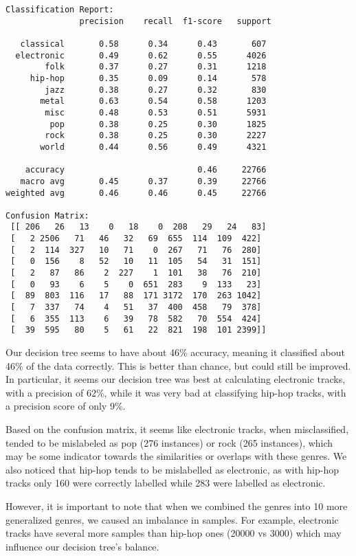 \documentclass[11pt]{article}
\begin{document}
    \begin{Verbatim}[commandchars=\\\{\}]
Classification Report:
               precision    recall  f1-score   support

   classical       0.58      0.34      0.43       607
  electronic       0.49      0.62      0.55      4026
        folk       0.37      0.27      0.31      1218
     hip-hop       0.35      0.09      0.14       578
        jazz       0.38      0.27      0.32       830
       metal       0.63      0.54      0.58      1203
        misc       0.48      0.53      0.51      5931
         pop       0.38      0.25      0.30      1825
        rock       0.38      0.25      0.30      2227
       world       0.44      0.56      0.49      4321

    accuracy                           0.46     22766
   macro avg       0.45      0.37      0.39     22766
weighted avg       0.46      0.46      0.45     22766

Confusion Matrix:
 [[ 206   26   13    0   18    0  208   29   24   83]
 [   2 2506   71   46   32   69  655  114  109  422]
 [   2  114  327   10   71    0  267   71   76  280]
 [   0  156    8   52   10   11  105   54   31  151]
 [   2   87   86    2  227    1  101   38   76  210]
 [   0   93    6    5    0  651  283    9  133   23]
 [  89  803  116   17   88  171 3172  170  263 1042]
 [   7  337   74    4   51   37  400  458   79  378]
 [   6  355  113    6   39   78  582   70  554  424]
 [  39  595   80    5   61   22  821  198  101 2399]]
    \end{Verbatim}

    Our decision tree seems to have about 46\% accuracy, meaning it
classified about 46\% of the data correctly. This is better than chance,
but could still be improved. In particular, it seems our decision tree
was best at calculating electronic tracks, with a precision of 62\%,
while it was very bad at classifying hip-hop tracks, with a precision
score of only 9\%.

Based on the confusion matrix, it seems like electronic tracks, when
misclassified, tended to be mislabeled as pop (276 instances) or rock
(265 instances), which may be some indicator towards the similarities or
overlaps with these genres. We also noticed that hip-hop tends to be
mislabelled as electronic, as with hip-hop tracks only 160 were
correctly labelled while 283 were labelled as electronic.

However, it is important to note that when we combined the genres into
10 more generalized genres, we caused an imbalance in samples. For
example, electronic tracks have several more samples than hip-hop ones
(20000 vs 3000) which may influence our decision tree's balance.
\end{document}
